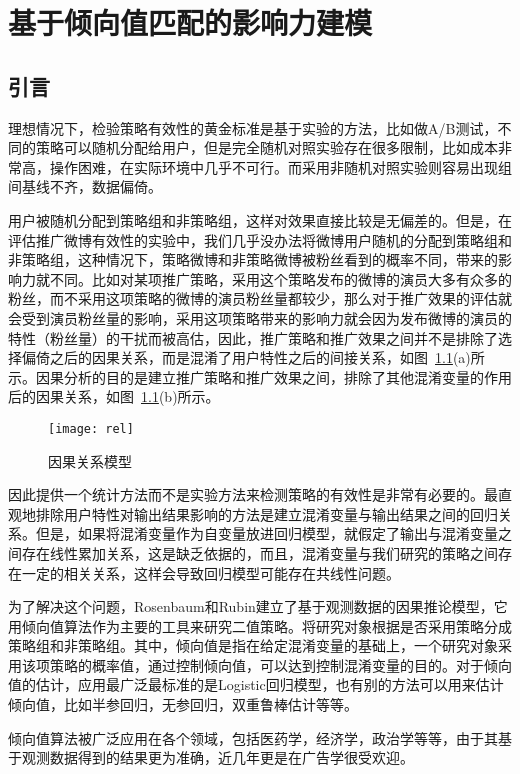 \chapter{基于倾向值匹配的影响力建模}

\section{引言}

理想情况下，检验策略有效性的黄金标准是基于实验的方法，比如做A/B测试，不同的策略可以随机分配给用户，但是完全随机对照实验存在很多限制，比如成本非常高，操作困难，在实际环境中几乎不可行。而采用非随机对照实验则容易出现组间基线不齐，数据偏倚。

用户被随机分配到策略组和非策略组，这样对效果直接比较是无偏差的。但是，在评估推广微博有效性的实验中，我们几乎没办法将微博用户随机的分配到策略组和非策略组，这种情况下，策略微博和非策略微博被粉丝看到的概率不同，带来的影响力就不同。比如对某项推广策略，采用这个策略发布的微博的演员大多有众多的粉丝，而不采用这项策略的微博的演员粉丝量都较少，那么对于推广效果的评估就会受到演员粉丝量的影响，采用这项策略带来的影响力就会因为发布微博的演员的特性（粉丝量）的干扰而被高估，因此，推广策略和推广效果之间并不是排除了选择偏倚之后的因果关系，而是混淆了用户特性之后的间接关系，如图~\ref{rel}(a)所示。因果分析的目的是建立推广策略和推广效果之间，排除了其他混淆变量的作用后的因果关系，如图~\ref{rel}(b)所示。

\begin{figure}[!htbp]
\centering
\texttt{[image: rel]}
\caption{因果关系模型}
\label{rel}
\end{figure}

因此提供一个统计方法而不是实验方法来检测策略的有效性是非常有必要的。最直观地排除用户特性对输出结果影响的方法是建立混淆变量与输出结果之间的回归关系。但是，如果将混淆变量作为自变量放进回归模型，就假定了输出与混淆变量之间存在线性累加关系，这是缺乏依据的，而且，混淆变量与我们研究的策略之间存在一定的相关关系，这样会导致回归模型可能存在共线性问题。

为了解决这个问题，Rosenbaum和Rubin建立了基于观测数据的因果推论模型\cite{rosenbaum1983central}，它用倾向值算法作为主要的工具来研究二值策略。将研究对象根据是否采用策略分成策略组和非策略组。其中，倾向值是指在给定混淆变量的基础上，一个研究对象采用该项策略的概率值，通过控制倾向值，可以达到控制混淆变量的目的。对于倾向值的估计，应用最广泛最标准的是Logistic回归模型，也有别的方法可以用来估计倾向值，比如半参回归，无参回归，双重鲁棒估计等等。

倾向值算法被广泛应用在各个领域，包括医药学，经济学，政治学等等，由于其基于观测数据得到的结果更为准确，近几年更是在广告学很受欢迎。

